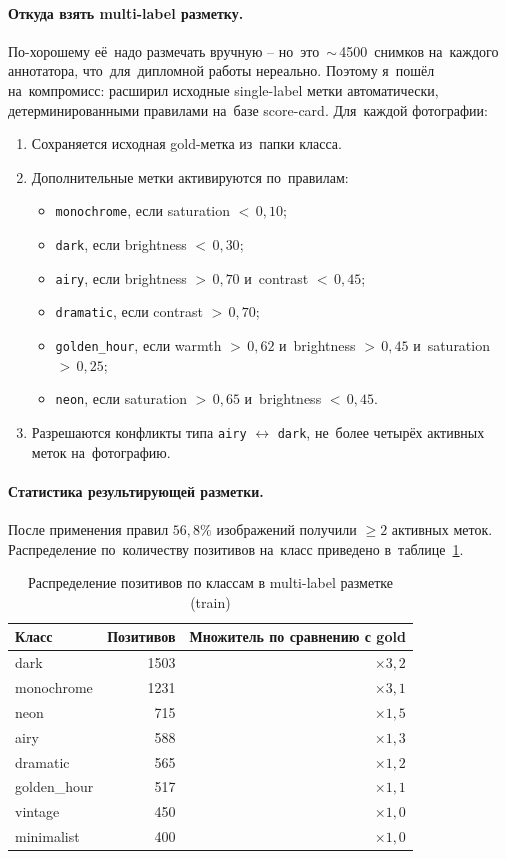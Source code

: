 \documentclass[a4paper,12pt]{diplom}
\renewcommand{\geq}{\geqslant}
\begin{document}
\paragraph{Откуда взять multi-label разметку.} По-хорошему её~надо размечать вручную -- но~это~$\sim$\,4500~снимков на~каждого аннотатора, что~для~дипломной работы нереально. Поэтому я~пошёл на~компромисс: расширил исходные single-label метки автоматически, детерминированными правилами на~базе score-card. Для~каждой фотографии:
\begin{enumerate}[label=\arabic{enumi})]
\item Сохраняется исходная gold-метка из~папки класса.
\item Дополнительные метки активируются по~правилам:
\begin{itemize}
\item \texttt{monochrome}, если saturation $<\,0{,}10$;
\item \texttt{dark}, если brightness $<\,0{,}30$;
\item \texttt{airy}, если brightness $>\,0{,}70$ и~contrast $<\,0{,}45$;
\item \texttt{dramatic}, если contrast $>\,0{,}70$;
\item \texttt{golden\_hour}, если warmth $>\,0{,}62$ и~brightness $>\,0{,}45$ и~saturation $>\,0{,}25$;
\item \texttt{neon}, если saturation $>\,0{,}65$ и~brightness $<\,0{,}45$.
\end{itemize}
\item Разрешаются конфликты типа \texttt{airy} $\leftrightarrow$ \texttt{dark}, не~более четырёх активных меток на~фотографию.
\end{enumerate}

\paragraph{Статистика результирующей разметки.} После применения правил $56{,}8\%$ изображений получили $\geq 2$ активных меток. Распределение по~количеству позитивов на~класс приведено в~таблице~\ref{tab:colabels}.

\begin{table}[!ht]
\caption{Распределение позитивов по классам в multi-label разметке (train)}
\label{tab:colabels}
\centering
\begin{tabular}{lrr}
\toprule
\textbf{Класс} & \textbf{Позитивов} & \textbf{Множитель по сравнению с gold} \\
\midrule
dark         & 1503 & $\times 3{,}2$ \\
monochrome   & 1231 & $\times 3{,}1$ \\
neon         &  715 & $\times 1{,}5$ \\
airy         &  588 & $\times 1{,}3$ \\
dramatic     &  565 & $\times 1{,}2$ \\
golden\_hour &  517 & $\times 1{,}1$ \\
vintage      &  450 & $\times 1{,}0$ \\
minimalist   &  400 & $\times 1{,}0$ \\
\bottomrule
\end{tabular}
\end{table}
\end{document}
